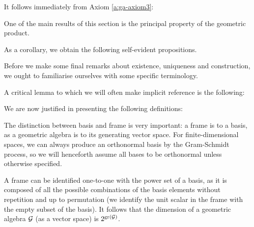 It follows immediately from Axiom \ref{a:ga-axiom3}:


%
%

%

%
%
One of the main results of this section is the principal property of the geometric product.



As a corollary, we obtain the following self-evident propositions.
%
%



Before we make some final remarks about existence, uniqueness and construction, we ought to familiarise ourselves with some specific terminology.


A critical lemma to which we will often make implicit reference is the following:



We are now justified in presenting the following definitions:





The distinction between basis and frame is very important: a frame is to a basis, as a geometric algebra is to its generating vector space.
For finite-dimensional spaces, we can always produce an orthonormal basis by the Gram-Schmidt process, so we will henceforth assume all bases to be orthonormal unless otherwise specified.

A frame can be identified one-to-one with the power set of a basis, as it is composed of all the possible combinations of the basis elements without repetition and up to permutation (we identify the unit scalar in the frame with the empty subset of the basis). It follows that the dimension of a geometric algebra $\mathcal{G}$ (as a vector space) is $2^{\mathrm{gr}\left(\mathcal{G}\right)}$.

